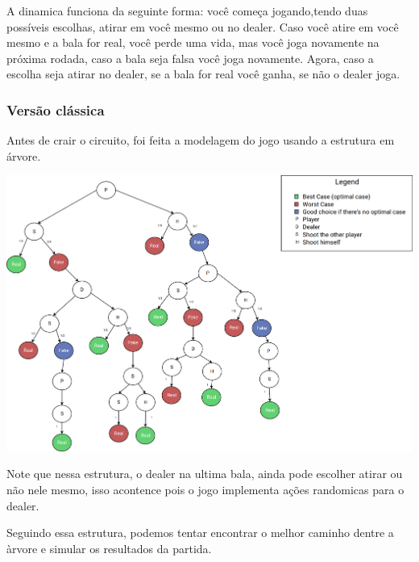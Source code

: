 \documentclass{article}
\begin{document}
A dinamica funciona da seguinte forma: você começa jogando,tendo duas possíveis escolhas, atirar em você mesmo ou no dealer. Caso você atire em você mesmo e a bala for real, você perde uma vida, mas você joga novamente na próxima rodada, caso a bala seja falsa você joga novamente. Agora, caso a escolha seja atirar no dealer, se a bala for real você ganha, se não o dealer joga.


\subsubsection{Versão clássica}

Antes de crair o circuito, foi feita a modelagem do jogo usando a estrutura em árvore.

\begin{center}
	\includegraphics[scale=0.2]{buckshot-roulette-diagram.png}
	\label{fig:classical-model-bckr}
\end{center}

Note que nessa estrutura, o dealer na ultima bala, ainda pode escolher atirar ou não nele mesmo, isso acontence pois o jogo implementa ações randomicas para o dealer.

Seguindo essa estrutura, podemos tentar encontrar o melhor caminho dentre a àrvore e simular os resultados da partida.
\end{document}
